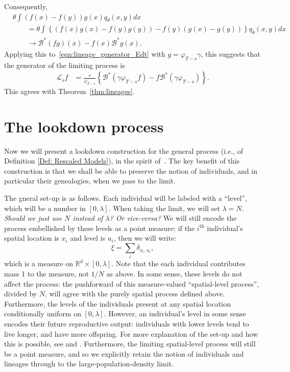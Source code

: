 \documentclass[12pt]{article}
\newcommand{\IR}{\mathbb R}
\newcommand{\DG}{\mathcal{B}}  %
\newcommand{\Lgen}{\mathcal{L}}    %
\newcommand{\lp}{\xi}              %
\newcommand{\comment}[1]{{\color{blue} \it #1}}
\begin{document}
Consequently,
\begin{align*}
    &
    \theta \int (f(x) - f(y)) g(x) q_\theta(x, y) dx \\
    &\qquad =
    \theta \int \left\{
        (f(x) g(x) - f(y) g(y)) - f(y) (g(x) - g(y))
    \right\} q_\theta(x, y) dx \\
    &\qquad \to
        \DG^*(fg)(x) - f(x) \DG^* g(x) . 
\end{align*}
Applying this to~\eqref{eqn:lineage_generator_Edt} with $g = \varphi_{T-s} \gamma$,
this suggests that the generator of the limiting process is
\begin{align} \label{eqn:heuristic_lineage_generator}
    \Lgen_s f
    &=
    \frac{r}{\varphi_{T-s}}
    \left\{
        \DG^*(\gamma \varphi_{T-s} f) - f \DG^*(\gamma \varphi_{T-s})
    \right\} .
\end{align}
This agrees with Theorem~\ref{thm:lineages}.


\section{The lookdown process}
    \label{sec:lookdown}


Now we will present a lookdown construction for the general process
(i.e., of Definition \ref{Def: Rescaled Models}),
in the spirit of~\cite{kurtz/rodrigues:2011}. 
The key benefit of this construction is that
we shall be able to preserve the notion of individuals,
and in particular their genealogies,
when we pass to the limit.


The gneral set-up is as follows.
Each individual will be labeled with a ``level'',
which will be a number in $[0, \lambda]$.
When taking the limit, we will set $\lambda = N$.
\comment{Should we just use $N$ instead of $\lambda$? Or vice-versa?}
We will still encode the process embellished by these levels
as a point measure:
if the $i^\mathrm{th}$ individual's spatial location is $x_i$
and level is $u_i$, then we will write:
$$
    \lp = \sum_i \delta_{x_i, u_i} ,
$$
which is a measure on $\IR^d \times [0, \lambda]$.
Note that the each individual contributes mass 1 to the measure,
not $1/N$ as above.
In some sense, these levels do not affect the process:
the pushforward of this measure-valued ``spatial-level process'',
divided by $N$,
will agree with the purely spatial process defined above.
Furthermore, the levels of the individuals present at any spatial location
conditionally uniform on $[0, \lambda]$.
However, an individual's level in some sense encodes their future reproductive output:
individuals with lower levels tend to live longer, and have more offspring.
For more explanation of the set-up and how this is possible,
see \citet{etheridge/kurtz:2018} and \citet{kurtz/rodrigues:2011}.
Furthermore, the limiting spatial-level process will still be a point measure,
and so we explicitly retain the notion of individuals and lineages through to the 
large-population-density limit.
\end{document}
